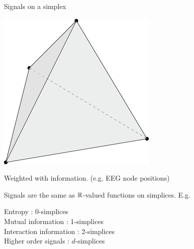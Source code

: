 \begin{frame}{Signals on a simplex}

	\begin{center}
		\includegraphics[scale=.35]{aux/3simplex}
	\end{center}

	\pause
	Weighted with  information. (e.g. EEG node positions)

	\pause\medskip
	Signals are the same as $\mathbb{R}$-valued functions on simplices. E.g.

	\qquad Entropy : 0-simplices \\
	\qquad Mutual information : 1-simplices \\
	\qquad Interaction information : 2-simplices \\
	\qquad Higher order signals : $d$-simplices

\end{frame}

